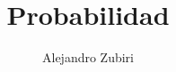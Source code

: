 \documentclass{report}
\author{Alejandro Zubiri}
\title{Probabilidad}
\begin{document}
\maketitle
\tableofcontents
\pagebreak





\end{document}
